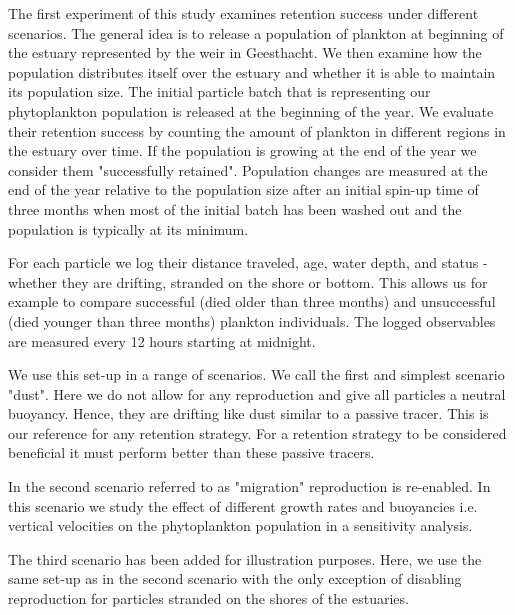 \documentclass[npg, manuscript]{copernicus}
\begin{document}
The first experiment of this study examines retention success under different scenarios.
The general idea is to release a population of plankton at beginning of the estuary represented by the weir in Geesthacht.
We then examine how the population distributes itself over the estuary and whether it is able to maintain its population size.
The initial particle batch that is representing our phytoplankton population is released at the beginning of the year.
We evaluate their retention success by counting the amount of plankton in different regions in the estuary over time.
If the population is growing at the end of the year we consider them "successfully retained".
Population changes are measured at the end of the year relative to the population size after an initial spin-up time of three months when most of the initial batch has been washed out and the population is typically at its minimum.

For each particle we log their distance traveled, age, water depth, and status - whether they are drifting, stranded on the shore or bottom.
This allows us for example to compare successful (died older than three months) and unsuccessful (died younger than three months) plankton individuals.
The logged observables are measured every 12 hours starting at midnight.

\medskip

We use this set-up in a range of scenarios.
We call the first and simplest scenario "dust". 
Here we do not allow for any reproduction and give all particles a neutral buoyancy.
Hence, they are drifting like dust similar to a passive tracer.
This is our reference for any retention strategy. 
For a retention strategy to be considered beneficial it must perform better than these passive tracers.

In the second scenario referred to as "migration" reproduction is re-enabled.
In this scenario we study the effect of different growth rates and buoyancies i.e. vertical velocities on the phytoplankton population in a sensitivity analysis.

The third scenario has been added for illustration purposes.
Here, we use the same set-up as in the second scenario with the only exception of disabling reproduction for particles stranded on the shores of the estuaries.

\end{document}
